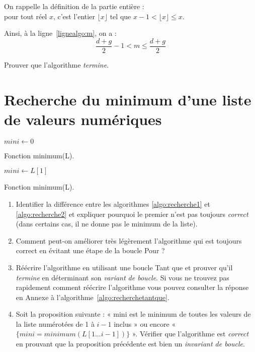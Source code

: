 On rappelle la définition de la partie entière :\\
pour tout réel $x$, c'est l'entier $\lfloor x \rfloor$ tel que $ x-1 < \lfloor x \rfloor \leq x$. 

Ainsi, à la ligne~\ref{lignealgo:m}, on a : $$ \frac{d+g}{2} - 1 < m \leq \frac{d+g}{2}$$

Prouver que l'algorithme \textit{termine}.

\section{Recherche du minimum d'une liste de valeurs numériques}
\label{sec:RechercheMinimum}

\begin{algorithm}[H]
$mini \leftarrow 0$ \;

\caption{Fonction minimum(L).}
\label{algo:recherche1}
\end{algorithm}

\begin{algorithm}[H]
$mini \leftarrow L[1]$ \;
\caption{Fonction minimum(L).}
\label{algo:recherche2}
\end{algorithm}

\begin{enumerate}

\item Identifier la différence entre les algorithmes \ref{algo:recherche1} et \ref{algo:recherche2} et expliquer pourquoi le premier n'est pas toujours \textit{correct} (dans certains cas, il ne donne pas le minimum de la liste).

\item Comment peut-on améliorer très légèrement l'algorithme qui est toujours correct en évitant une étape de la boucle Pour ?

\item Réécrire l'algorithme en utilisant une boucle Tant que et prouver qu'il \textit{termine} en déterminant son \textit{variant de boucle}. Si vous ne trouvez pas rapidement comment réécrire l'algorithme vous pouvez consulter la réponse en Annexe à l'algorithme~\ref{algo:recherchetantque}.

\item Soit la proposition suivante : « mini est le minimum de toutes les valeurs de la liste numérotées de 1 à $i-1$ inclus » ou encore « $\{mini = minimum(L[1...i-1])\}$ ». Vérifier que l'algorithme est \textit{correct} en prouvant que la proposition précédente est bien un \textit{invariant de boucle}.

\end{enumerate}


